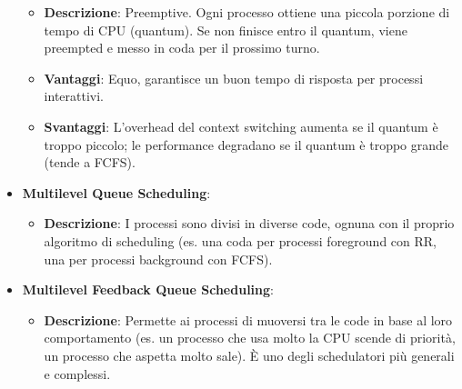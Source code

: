 \begin{itemize}
    \begin{itemize}
        \item \textbf{Descrizione}: Preemptive. Ogni processo ottiene una piccola porzione di tempo di CPU (quantum). Se non finisce entro il quantum, viene preempted e messo in coda per il prossimo turno.
        \item \textbf{Vantaggi}: Equo, garantisce un buon tempo di risposta per processi interattivi.
        \item \textbf{Svantaggi}: L'overhead del context switching aumenta se il quantum è troppo piccolo; le performance degradano se il quantum è troppo grande (tende a FCFS).
    \end{itemize}
    \item \textbf{Multilevel Queue Scheduling}:
    \begin{itemize}
        \item \textbf{Descrizione}: I processi sono divisi in diverse code, ognuna con il proprio algoritmo di scheduling (es. una coda per processi foreground con RR, una per processi background con FCFS).
    \end{itemize}
    \item \textbf{Multilevel Feedback Queue Scheduling}:
    \begin{itemize}
        \item \textbf{Descrizione}: Permette ai processi di muoversi tra le code in base al loro comportamento (es. un processo che usa molto la CPU scende di priorità, un processo che aspetta molto sale). È uno degli schedulatori più generali e complessi.
    \end{itemize}
\end{itemize}


